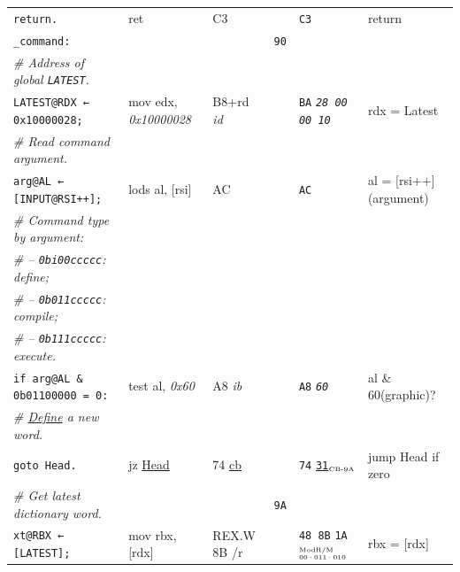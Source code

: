 \documentclass[a4paper,12pt,final]{article}
\begin{document}
\begin{table}[!htbp]
\begin{adjustwidth}{-1cm}{-1cm}
\begin{center}
\begin{tabular}{l|ll|l|lH}
\hspace{1em} \texttt{return.} & ret & C3 &  & \texttt{C3} & return\\[0pt]
\texttt{\_command:} &  &  & \texttt{90} &  & \\[0pt]
\hspace{1em} \emph{\# Address of global \texttt{LATEST}.} &  &  &  &  & \\[0pt]
\hspace{1em} \texttt{LATEST@RDX ← 0x10000028;} & mov edx, \emph{0x10000028} & B8+rd \emph{id} &  & \texttt{BA} \emph{\texttt{28 00 00 10}} & rdx = Latest\\[0pt]
\hspace{1em} \emph{\# Read command argument.} &  &  &  &  & \\[0pt]
\hspace{1em} \texttt{arg@AL ← [INPUT@RSI++];} & lods al, [rsi] & AC &  & \texttt{AC} & al = [rsi++] (argument)\\[0pt]
\hspace{1em} \emph{\# Command type by argument:} &  &  &  &  & \\[0pt]
\hspace{1em} \emph{\# – \texttt{0bi00ccccc}: define;} &  &  &  &  & \\[0pt]
\hspace{1em} \emph{\# – \texttt{0b011ccccc}: compile;} &  &  &  &  & \\[0pt]
\hspace{1em} \emph{\# – \texttt{0b111ccccc}: execute.} &  &  &  &  & \\[0pt]
\hspace{1em} \texttt{if arg@AL \& 0b01100000 = 0:} & test al, \emph{0x60} & A8 \emph{ib} &  & \texttt{A8} \emph{\texttt{60}} & al \& 60(graphic)?\\[0pt]
\hspace{2em}     \emph{\# \uline{Define} a new word.} &  &  &  &  & \\[0pt]
\hspace{2em}     \texttt{goto Head.} & jz \uline{Head} & 74 \uline{cb} &  & \texttt{74} \uline{\texttt{31}}​\(_{\text{\tiny CB-9A}}\) & jump Head if zero\\[0pt]
\hspace{1em} \emph{\# Get latest dictionary word.} &  &  & \texttt{9A} &  & \\[0pt]
\hspace{1em} \texttt{xt@RBX ← [LATEST];} & mov rbx, [rdx] & REX.W 8B /r &  & \texttt{48 8B} \texttt{1A}​\(^{\text{\tiny ModR/M}}_{\text{\tiny 00·011·010}}\) & rbx = [rdx]\\[0pt]

\end{tabular}
\end{center}
\end{adjustwidth}
\end{table}
\end{document}
